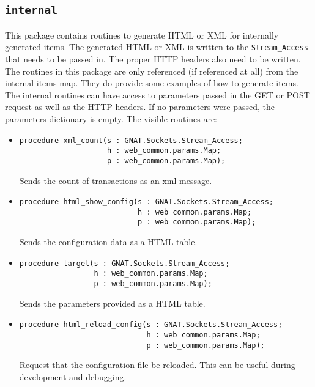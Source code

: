 \documentclass[10pt, openany]{book}
\begin{document}
\subsection{\texttt{internal}}
This package contains routines to generate HTML or XML for internally generated items.  The generated HTML or XML is written to the \texttt{Stream\_Access} that needs to be passed in.  The proper HTTP headers also need to be written.  The routines in this package are only referenced (if referenced at all) from the internal items map.  They do provide some examples of how to generate items.  The internal routines can have access to parameters passed in the GET or POST request as well as the HTTP headers.  If no parameters were passed, the parameters dictionary is empty.  The visible routines are:
\begin{itemize}
  \item \begin{lstlisting}
procedure xml_count(s : GNAT.Sockets.Stream_Access;
                    h : web_common.params.Map;
                    p : web_common.params.Map);
\end{lstlisting}
  Sends the count of transactions as an xml message.
  \item \begin{lstlisting}
procedure html_show_config(s : GNAT.Sockets.Stream_Access;
                           h : web_common.params.Map;
                           p : web_common.params.Map);
\end{lstlisting}
  Sends the configuration data as a HTML table.
  \item \begin{lstlisting}
procedure target(s : GNAT.Sockets.Stream_Access;
                 h : web_common.params.Map;
                 p : web_common.params.Map);
\end{lstlisting}
  Sends the parameters provided as a HTML table.
  \item \begin{lstlisting}
procedure html_reload_config(s : GNAT.Sockets.Stream_Access;
                             h : web_common.params.Map;
                             p : web_common.params.Map);
\end{lstlisting}
  Request that the configuration file be reloaded.  This can be useful during development and debugging.
\end{itemize}
\end{document}
